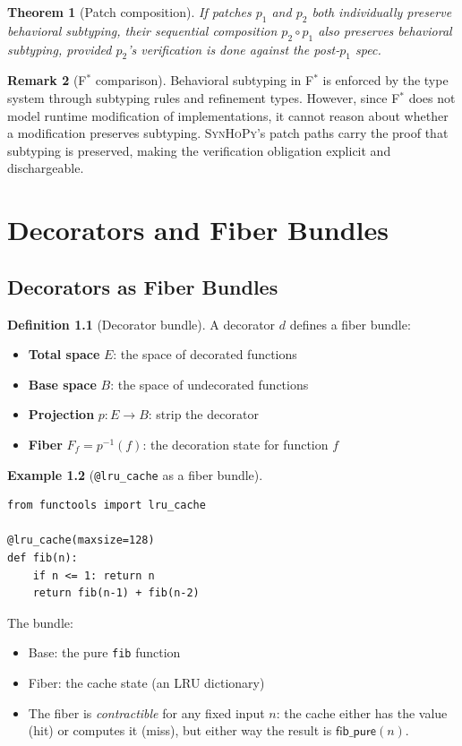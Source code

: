 \documentclass[11pt,a4paper]{report}
\theoremstyle{definition}
\newtheorem{definition}{Definition}[chapter]
\newtheorem{example}[definition]{Example}
\newtheorem{remark}[definition]{Remark}
\theoremstyle{plain}
\newtheorem{theorem}[definition]{Theorem}
\newcommand{\fstar}{F$^{*}$}
\newcommand{\synhopy}{\textsc{SynHoPy}}
\begin{document}
\begin{theorem}[Patch composition]
\label{thm:patch-compose}
If patches $p_1$ and $p_2$ both individually preserve behavioral subtyping,
their sequential composition $p_2 \circ p_1$ also preserves behavioral subtyping,
provided $p_2$'s verification is done against the post-$p_1$ spec.
\end{theorem}

\begin{remark}[\fstar{} comparison]
Behavioral subtyping in \fstar{} is enforced by the type system through
subtyping rules and refinement types. However, since \fstar{} does not model
runtime modification of implementations, it cannot reason about whether a
modification preserves subtyping. \synhopy{}'s patch paths carry the proof
that subtyping is preserved, making the verification obligation explicit and
dischargeable.
\end{remark}


\chapter{Decorators and Fiber Bundles}
\label{ch:decorators}

\section{Decorators as Fiber Bundles}

\begin{definition}[Decorator bundle]
A decorator $d$ defines a fiber bundle:
\begin{itemize}
  \item \textbf{Total space} $E$: the space of decorated functions
  \item \textbf{Base space} $B$: the space of undecorated functions
  \item \textbf{Projection} $p : E \to B$: strip the decorator
  \item \textbf{Fiber} $F_f = p^{-1}(f)$: the decoration state for function $f$
\end{itemize}
\end{definition}

\begin{example}[\texttt{@lru\_cache} as a fiber bundle]
\begin{lstlisting}[style=python]
from functools import lru_cache

@lru_cache(maxsize=128)
def fib(n):
    if n <= 1: return n
    return fib(n-1) + fib(n-2)
\end{lstlisting}

The bundle:
\begin{itemize}
  \item Base: the pure \texttt{fib} function
  \item Fiber: the cache state (an LRU dictionary)
  \item The fiber is \emph{contractible} for any fixed input $n$: the cache either
    has the value (hit) or computes it (miss), but either way the result is
    $\mathsf{fib\_pure}(n)$.
\end{itemize}
\end{example}
\end{document}
